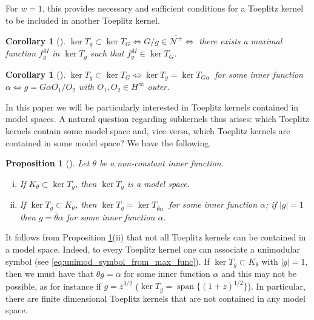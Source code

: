 \documentclass{article}
\numberwithin{equation}{section}
\theoremstyle{plain}
\newtheorem{prop}[thm]{Proposition}
\newtheorem{cor}[thm]{Corollary}
\newcommand{\Hinf}{\ensuremath{H^\infty}}
\newcommand{\NN}{\ensuremath{\mathcal{N}^+}}
\newcommand{\ol}[1]{\ensuremath{\overline{#1}}}
\newcommand{\spn}{\ensuremath{\operatorname{span}}}
\newcommand{\kertg}{\ensuremath{\ker T_g}}
\begin{document}
For $w=1$, this provides necessary and sufficient conditions for a Toeplitz kernel to be included in another Toeplitz kernel.


\begin{cor}[{\cite[Proposition 2.16]{CP18_multipliers}}]
\label{cor:kernel.subset.of.another.kernel}
$\ker T_g \subset \ker T_G \iff {G/g \in \ol\NN} \iff$ there exists a maximal function $f^M_g$ in $\ker T_g$ such that $f^M_g \in \ker T_G$.
\end{cor}


\begin{cor}[{\cite{CP18_multipliers}}]
\label{cor:subkernel_galpha}
$\ker T_g \subset \ker T_G \iff \ker T_g = \ker T_{G\alpha}\ $ for some inner function $\alpha \iff g = G\alpha \ol{O_1} / \ol{O_2}$ with $O_1,O_2 \in\Hinf$ outer.
\end{cor}


In this paper we will be particularly interested in Toeplitz kernels contained in model spaces.
A natural question regarding subkernels thus arises: which Toeplitz kernels contain some model space and, vice-versa, which Toeplitz kernels are contained in some model space?
We have the following.


\begin{prop}[{\cite{CP18_multipliers}}]
\label{prop:subkernel_modelspace}
Let $\theta$ be a non-constant inner function.
\begin{enumerate}[(i)]
\item If $K_\theta \subset \kertg$, then $\kertg$ is a model space.

\item If $\kertg \subset K_\theta$, then $\kertg = \ker T_{\ol\theta \alpha}\ $ for some inner function $\alpha$;
if $|g|=1$ then $g=\ol\theta \alpha$ for some inner function $\alpha$.
\end{enumerate}
\end{prop}


It follows from Proposition \ref{prop:subkernel_modelspace}(ii) that not all Toeplitz kernels can be contained in a model space.
Indeed, to every Toeplitz kernel one can associate a unimodular symbol (see \eqref{eq:unimod_symbol_from_max_func}).
If $\kertg \subset K_\theta$ with $|g|=1$, then we must have that $\theta g = \alpha$ for some inner function $\alpha$ and this may not be possible, as for instance if $g=\ol z^{3/2}$ ($\kertg = \spn \{ (1+z)^{1/2} \}$).
In particular, there are finite dimensional Toeplitz kernels that are not contained in any model space.
\end{document}
